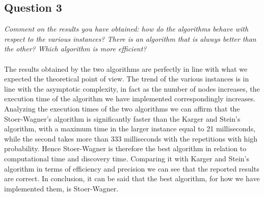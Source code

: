 \subsection{Question 3}
\textit{Comment on the results you have obtained: how do the algorithms behave with respect to the various instances? There is an algorithm that is always better than the other? Which algorithm is more efficient?}\\ \\
\noindent
The results obtained by the two algorithms are perfectly in line with what we expected the theoretical point of view. The trend of the various instances is in line with the asymptotic complexity, in fact as the number of nodes increases, the execution time of the algorithm we have implemented correspondingly increases.\\ \noindent
Analyzing the execution times of the two algorithms we can affirm that the Stoer-Wagner's algorithm is significantly faster than the Karger and Stein's algorithm, with a maximum time in the larger instance equal to 21 milliseconds, while the second takes more than 333 milliseconds with the repetitions with high probability. Hence Stoer-Wagner is therefore the best algorithm in relation to computational time and discovery time. Comparing it with Karger and Stein's algorithm in terms of efficiency and precision we can see that the reported results are correct. In conclusion, it can be said that the best algorithm, for how we have implemented them, is Stoer-Wagner.
